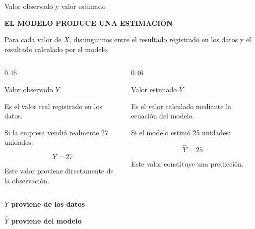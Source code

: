 \documentclass[aspectratio=169,11pt]{beamer}
\newcommand{\kicker}[1]{%
  {\scriptsize\bfseries\color{cAcc}\MakeUppercase{#1}}%
  \par\vspace{0.2em}%
}
\newcommand{\destaca}[1]{%
  {\color{cPrim}\bfseries #1}%
}
\newenvironment{cerrado}[1]
  {\begin{block}{#1}
   \begin{minipage}{\linewidth}
   \raggedright}
  {\end{minipage}
   \end{block}}
\begin{document}
\begin{frame}{Valor observado y valor estimado}

  \begin{center}
    \begin{minipage}{0.88\textwidth}

      \kicker{EL MODELO PRODUCE UNA ESTIMACIÓN}

      Para cada valor de \(X\), distinguimos entre el resultado registrado
      en los datos y el resultado calculado por el modelo.

      \vspace{0.5em}

      \begin{columns}[T,onlytextwidth]

        \begin{column}{0.46\textwidth}

          \begin{cerrado}{Valor observado \(Y\)}

            Es el valor real registrado en los datos.

            \vspace{0.5em}

            Si la empresa vendió realmente 27 unidades:

            \[
              Y=27
            \]

            Este valor proviene directamente de la observación.

          \end{cerrado}

        \end{column}

        \begin{column}{0.46\textwidth}

          \begin{cerrado}{Valor estimado \(\hat{Y}\)}

            Es el valor calculado mediante la ecuación del modelo.

            \vspace{0.5em}

            Si el modelo estimó 25 unidades:

            \[
              \hat{Y}=25
            \]

            Este valor constituye una predicción.

          \end{cerrado}

        \end{column}

      \end{columns}

      \vspace{0.0em}

      \begin{center}
        \destaca{\(Y\) proviene de los datos}
        \qquad
        \destaca{\(\hat{Y}\) proviene del modelo}
      \end{center}

    \end{minipage}
  \end{center}

\end{frame}
\end{document}
